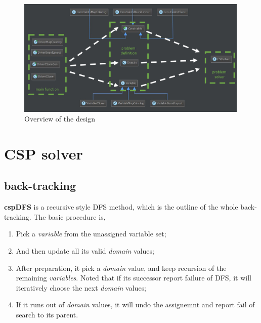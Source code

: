 \documentclass{article}
\begin{document}
\begin{figure}[!h]
\centering
\includegraphics[width=0.99\textwidth]{class_layout.png}
\caption{Overview of the design}
\label{classlayout}
\end{figure}




















\clearpage
\section{CSP solver}
\subsection{back-tracking}

\textbf{cspDFS} is a recursive style DFS method, which is the outline of the whole back-tracking. The basic procedure is,

\begin{enumerate}
  \item  Pick a \emph{variable} from the unassigned variable set;
  \item And then update all its valid \emph{domain} values;
  \item After preparation, it pick a \emph{domain} value, and keep recursion of the remaining \emph{variables}. Noted that if its successor report failure of DFS, it will iteratively choose the next \emph{domain} values;
\item   If it runs out of \emph{domain} values, it will undo the assignemnt and report fail of search to its parent.
\end{enumerate}
\end{document}
